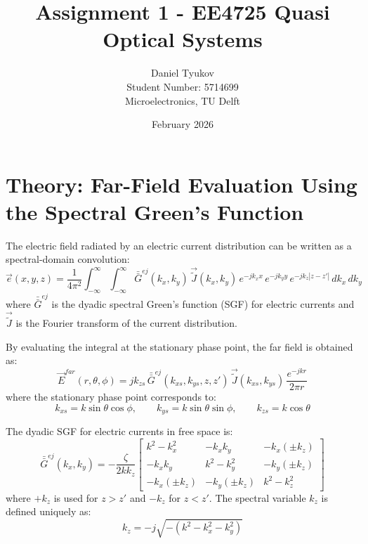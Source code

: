 \documentclass{article}
\title{Assignment 1 - EE4725 Quasi Optical Systems}
\author{Daniel Tyukov \\ Student Number: 5714699 \\ Microelectronics, TU Delft}
\date{February 2026}
\begin{document}
\maketitle

\tableofcontents
\newpage

\section{Theory: Far-Field Evaluation Using the Spectral Green's Function}

The electric field radiated by an electric current distribution can be written as a spectral-domain convolution:
\begin{equation}\label{eq:efield}
\vec{e}(x,y,z) = \frac{1}{4\pi^2}\int_{-\infty}^{\infty}\int_{-\infty}^{\infty}
\bar{\bar{G}}^{ej}(k_x,k_y)\,\vec{\tilde{J}}(k_x,k_y)\,
e^{-jk_x x}\,e^{-jk_y y}\,e^{-jk_z|z-z'|}\,dk_x\,dk_y
\end{equation}
where $\bar{\bar{G}}^{ej}$ is the dyadic spectral Green's function (SGF) for electric currents and $\vec{\tilde{J}}$ is the Fourier transform of the current distribution.

By evaluating the integral at the stationary phase point, the far field is obtained as:
\begin{equation}\label{eq:farfield}
\vec{E}^{far}(r,\theta,\phi) = j k_{zs}\,\bar{\bar{G}}^{ej}(k_{xs},k_{ys},z,z')\,
\vec{\tilde{J}}(k_{xs},k_{ys})\,\frac{e^{-jkr}}{2\pi r}
\end{equation}
where the stationary phase point corresponds to:
\begin{equation}
k_{xs} = k\sin\theta\cos\phi, \qquad
k_{ys} = k\sin\theta\sin\phi, \qquad
k_{zs} = k\cos\theta
\end{equation}

The dyadic SGF for electric currents in free space is:
\begin{equation}\label{eq:sgf}
\bar{\bar{G}}^{ej}(k_x,k_y) = -\frac{\zeta}{2kk_z}
\begin{bmatrix}
k^2-k_x^2 & -k_xk_y & -k_x(\pm k_z)\\
-k_xk_y & k^2-k_y^2 & -k_y(\pm k_z)\\
-k_x(\pm k_z) & -k_y(\pm k_z) & k^2-k_z^2
\end{bmatrix}
\end{equation}
where $+k_z$ is used for $z > z'$ and $-k_z$ for $z < z'$. The spectral variable $k_z$ is defined uniquely as:
\begin{equation}\label{eq:kz}
k_z = -j\sqrt{-(k^2-k_x^2-k_y^2)}
\end{equation}
\end{document}
